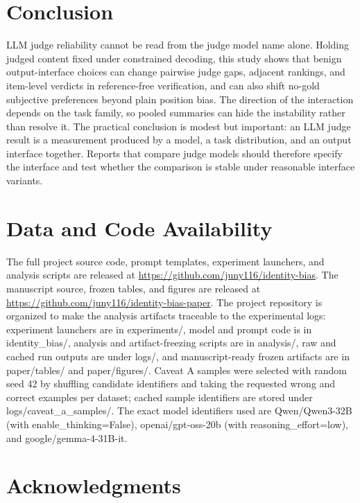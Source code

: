\documentclass[journal]{IEEEtran}
\begin{document}
\section{Conclusion}
\label{sec:conclusion}

LLM judge reliability cannot be read from the judge model name alone. Holding judged content fixed under constrained decoding, this study shows that benign output-interface choices can change pairwise judge gaps, adjacent rankings, and item-level verdicts in reference-free verification, and can also shift no-gold subjective preferences beyond plain position bias. The direction of the interaction depends on the task family, so pooled summaries can hide the instability rather than resolve it. The practical conclusion is modest but important: an LLM judge result is a measurement produced by a model, a task distribution, and an output interface together. Reports that compare judge models should therefore specify the interface and test whether the comparison is stable under reasonable interface variants.

\section*{Data and Code Availability}

The full project source code, prompt templates, experiment launchers, and analysis scripts are released at \url{https://github.com/juny116/identity-bias}. The manuscript source, frozen tables, and figures are released at \url{https://github.com/juny116/identity-bias-paper}. The project repository is organized to make the analysis artifacts traceable to the experimental logs: experiment launchers are in experiments/, model and prompt code is in identity\_bias/, analysis and artifact-freezing scripts are in analysis/, raw and cached run outputs are under logs/, and manuscript-ready frozen artifacts are in paper/tables/ and paper/figures/. Caveat A samples were selected with random seed 42 by shuffling candidate identifiers and taking the requested wrong and correct examples per dataset; cached sample identifiers are stored under logs/caveat\_a\_samples/. The exact model identifiers used are Qwen/Qwen3-32B (with enable\_thinking=False), openai/gpt-oss-20b (with reasoning\_effort=low), and google/gemma-4-31B-it.

\section*{Acknowledgments}
\end{document}
